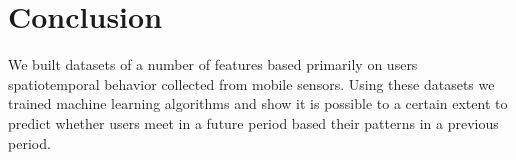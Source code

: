 \chapter{Conclusion}
\label{chap:conclusion}
 We built datasets of a number of features based primarily on users spatiotemporal behavior collected from mobile sensors. Using these datasets we trained machine learning algorithms and show it is possible to a certain extent to predict whether users meet in a future period based their patterns in a previous period.